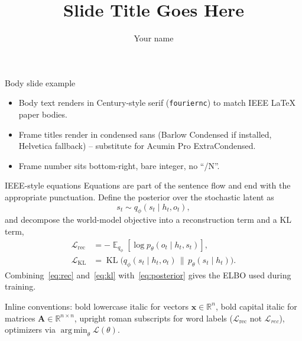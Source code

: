 \documentclass[10pt, aspectratio=169]{beamer}
\title{Slide Title Goes Here}
\author{Your name}
\institute{Dr.~Mengxue Hou}    %
\date{}                         %
\DeclareMathOperator{\KL}{KL}
\DeclareMathOperator*{\E}{\mathbb{E}}
\DeclareMathOperator*{\argmin}{arg\,min}
\begin{document}
\frame{\titlepage}

\begin{frame}{Body slide example}
  \begin{itemize}
    \item Body text renders in Century-style serif (\texttt{fouriernc}) to match
          IEEE LaTeX paper bodies.
    \item Frame titles render in condensed sans (Barlow Condensed if installed,
          Helvetica fallback) -- substitute for Acumin Pro ExtraCondensed.
    \item Frame number sits bottom-right, bare integer, no ``/N''.
  \end{itemize}
\end{frame}

\begin{frame}{IEEE-style equations}
  Equations are part of the sentence flow and end with the appropriate
  punctuation. Define the posterior over the stochastic latent as
  \begin{equation}\label{eq:posterior}
    s_t \sim q_\phi(s_t \mid h_t, o_t),
  \end{equation}
  and decompose the world-model objective into a reconstruction term and a
  KL term,
  \begin{align}
    \mathcal{L}_{\mathrm{rec}}
    &= -\E_{q_\phi}\!\left[\log p_\theta(o_t \mid h_t, s_t)\right],
    \label{eq:rec}
    \\
    \mathcal{L}_{\mathrm{KL}}
    &= \KL\!\big(q_\phi(s_t \mid h_t, o_t)\,\big\|\,p_\theta(s_t \mid h_t)\big).
    \label{eq:kl}
  \end{align}
  Combining~\eqref{eq:rec} and~\eqref{eq:kl} with~\eqref{eq:posterior} gives
  the ELBO used during training.

  \medskip
  Inline conventions: bold lowercase italic for vectors $\bm{x}\in\mathbb{R}^{n}$,
  bold capital italic for matrices $\bm{A}\in\mathbb{R}^{n\times n}$, upright
  roman subscripts for word labels ($\mathcal{L}_{\mathrm{rec}}$ not
  $\mathcal{L}_{rec}$), optimizers via $\argmin_{\theta} \mathcal{L}(\theta)$.
\end{frame}
\end{document}
